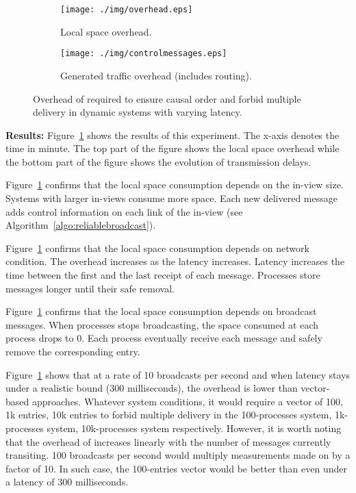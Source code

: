 \begin{figure*}
  \begin{center}
    \begin{subfigure}[t]{0.495\textwidth}
    \texttt{[image: ./img/overhead.eps]}
    \caption{\label{fig:overhead}Local space overhead.}
    \end{subfigure}
    \begin{subfigure}[t]{0.495\textwidth}      
      \texttt{[image: ./img/controlmessages.eps]}
      \caption{\label{fig:controlmessages}Generated traffic overhead (includes
        routing).}
    \end{subfigure}
    \caption{Overhead of \RPCBROADCAST required to ensure causal order and
      forbid multiple delivery in dynamic systems with varying latency.}
  \end{center}
\end{figure*}



\noindent \textbf{Results:} Figure~\ref{fig:overhead} shows the results of this
experiment. The x-axis denotes the time in minute. The top part of the figure
shows the local space overhead while the bottom part of the figure shows the
evolution of transmission delays.

\noindent Figure~\ref{fig:overhead} confirms that the local space consumption
depends on the in-view size. Systems with larger in-views consume more
space. Each new delivered message adds control information on each link of the
in-view (see Algorithm~\ref{algo:reliablebroadcast}).

\noindent Figure~\ref{fig:overhead} confirms that the local space consumption
depends on network condition. The overhead increases as the latency
increases. Latency increases the time between the first and the last receipt of
each message. Processes store messages longer until their safe removal.

\noindent Figure~\ref{fig:overhead} confirms that the local space consumption
depends on broadcast messages. When processes stops broadcasting, the space
consumed at each process drops to 0. Each process eventually receive each
message and safely remove the corresponding entry.

\noindent Figure~\ref{fig:overhead} shows that at a rate of 10 broadcasts per
second and when latency stays under a realistic bound ($300$ milliseconds), the
overhead is lower than vector-based approaches. Whatever system conditions, it
would require a vector of 100, 1k entries, 10k entries to forbid multiple
delivery in the 100-processes system, 1k-processes system, 10k-processes system
respectively. However, it is worth noting that the overhead of \RPCBROADCAST
increases linearly with the number of messages currently transiting. 100
broadcasts per second would multiply measurements made on \RPCBROADCAST by a
factor of 10. In such case, the 100-entries vector would be better than
\RPCBROADCAST even under a latency of $300$ milliseconds.

